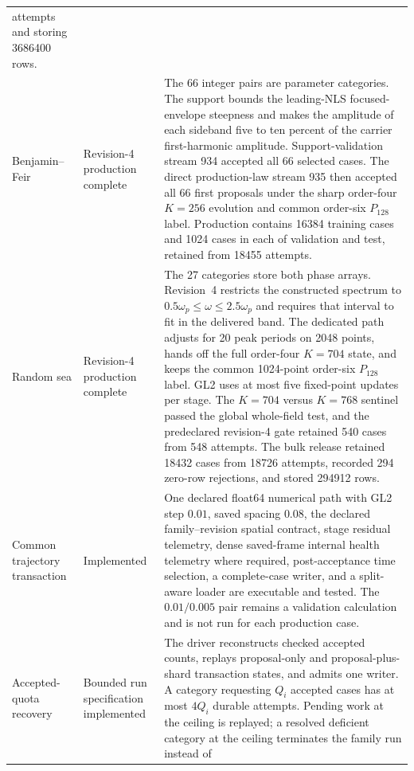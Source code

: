 \documentclass[11pt]{article}
\begin{document}
\begin{center}
\begin{tabularx}{\textwidth}{
  @{}>{\raggedright\arraybackslash}p{}
     >{\raggedright\arraybackslash}p{}
     >{\raggedright\arraybackslash}X@{}}
      18432 attempts and storing 3686400 rows. \\
  Benjamin--Feir
    & Revision-4 production complete
    & The 66 integer pairs are parameter categories.  The support bounds the
      leading-NLS focused-envelope steepness and makes the amplitude of each
      sideband five to ten percent of the carrier first-harmonic amplitude.
      Support-validation stream 934 accepted all 66 selected cases.  The
      direct production-law stream 935 then accepted all 66 first proposals
      under the sharp order-four \(K=256\) evolution and common order-six
      \(P_{128}\) label.  Production contains 16384 training cases and 1024
      cases in each of validation and test, retained from 18455 attempts. \\
  Random sea
    & Revision-4 production complete
    & The 27 categories store both phase arrays.  Revision~4 restricts the
      constructed spectrum to $0.5\omega_p\leq\omega\leq2.5\omega_p$ and
      requires that interval to fit in the delivered band.  The dedicated path adjusts
      for 20 peak periods on 2048 points, hands off the full order-four
      \(K=704\) state, and keeps the common 1024-point order-six \(P_{128}\)
      label.  GL2 uses at most five fixed-point updates per stage.  The
      \(K=704\) versus \(K=768\) sentinel passed the global whole-field test,
      and the predeclared revision-4 gate retained 540 cases from 548
      attempts.  The bulk release retained 18432 cases from 18726 attempts,
      recorded 294 zero-row rejections, and stored 294912 rows. \\
  Common trajectory transaction
    & Implemented
    & One declared float64 numerical path with GL2 step $0.01$, saved spacing
      $0.08$, the
      declared family--revision spatial contract, stage residual telemetry,
      dense saved-frame internal health telemetry where required,
      post-acceptance time selection, a complete-case writer, and a split-aware
      loader are executable and tested.  The $0.01/0.005$ pair remains a
      validation calculation and is not run for each production case. \\
  Accepted-quota recovery
    & Bounded run specification implemented
    & The driver reconstructs checked accepted counts, replays proposal-only
      and proposal-plus-shard transaction states, and admits one writer.  A
      category requesting $Q_i$ accepted cases has at most $4Q_i$ durable
      attempts.  Pending work at the ceiling is replayed; a resolved
      deficient category at the ceiling terminates the family run instead of

\end{tabularx}
\end{center}
\end{document}
